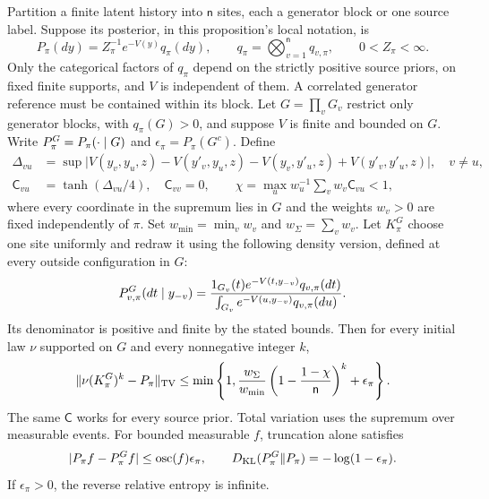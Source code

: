 Partition a finite latent history into $\mathsf n$ sites, each a generator block or one
source label. Suppose its posterior, in this proposition's local notation, is
\begin{equation}
P_\pi(dy)=Z_\pi^{-1}e^{-V(y)}q_\pi(dy),\qquad
q_\pi=\bigotimes_{v=1}^{\mathsf n}q_{v,\pi},\qquad 0<Z_\pi<\infty.
\label{eq:link-comparison-target}
\end{equation}
Only the categorical factors of $q_\pi$ depend on the strictly positive source
priors, on fixed finite supports, and $V$ is independent of them. A correlated
generator reference must be contained within its block. Let
$G=\prod_vG_v$ restrict only generator blocks, with $q_\pi(G)>0$, and suppose
$V$ is finite and bounded on $G$. Write $P_\pi^G=P_\pi(\cdot\mid G)$ and
$\epsilon_\pi=P_\pi(G^c)$. Define
\begin{equation}
\begin{split}
\Delta_{vu}&=\sup\bigl|V(y_v,y_u,z)-V(y'_v,y_u,z)
-V(y_v,y'_u,z)+V(y'_v,y'_u,z)\bigr|,\quad v\ne u,\\
\mathsf C_{vu}&=\tanh(\Delta_{vu}/4),\quad \mathsf C_{vv}=0,
\qquad \chi=\max_u w_u^{-1}\sum_vw_v\mathsf C_{vu}<1,
\end{split}
\label{eq:link-mixed-oscillation}
\end{equation}
where every coordinate in the supremum lies in $G$ and the weights $w_v>0$ are
fixed independently of $\pi$. Set $w_{\min}=\min_vw_v$ and
$w_\Sigma=\sum_vw_v$. Let $K_\pi^G$ choose one site
uniformly and redraw it using the following density version, defined at every
outside configuration in $G$:
\begin{equation}
P_{v,\pi}^G(dt\mid y_{-v})=
\frac{1_{G_v}(t)e^{-V(t,y_{-v})}q_{v,\pi}(dt)}
{\int_{G_v}e^{-V(u,y_{-v})}q_{v,\pi}(du)}.
\label{eq:link-everywhere-conditional}
\end{equation}
Its denominator is positive and finite by the stated bounds. Then for every
initial law $\nu$ supported on $G$ and every nonnegative integer $k$,
\begin{equation}
\|\nu(K_\pi^G)^k-P_\pi\|_{\rm TV}
\le\min\left\{1,\frac{w_\Sigma}{w_{\min}}
\left(1-\frac{1-\chi}{\mathsf n}\right)^k+\epsilon_\pi\right\}.
\label{eq:link-endpoint-comparison}
\end{equation}
The same $\mathsf C$ works for every source prior. Total variation uses the
supremum over measurable events. For bounded measurable $f$, truncation alone
satisfies
\begin{equation}
|P_\pi f-P_\pi^Gf|\le\operatorname{osc}(f)\epsilon_\pi,
\qquad
D_{\mathrm{KL}}(P_\pi^G\Vert P_\pi)=-\log(1-\epsilon_\pi).
\label{eq:link-endpoint-truncation}
\end{equation}
If $\epsilon_\pi>0$, the reverse relative entropy is infinite.

